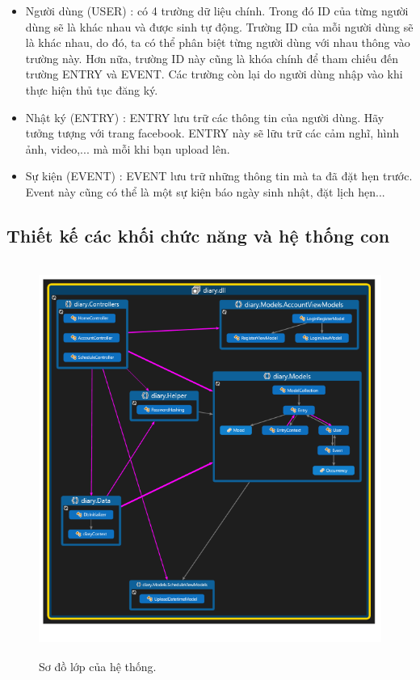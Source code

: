 \documentclass[a4paper]{article}
\begin{document}
\begin{itemize}
	\item Người dùng (USER) : có 4 trường dữ liệu chính. Trong đó ID của từng người dùng sẽ là khác nhau và được sinh tự động. Trường ID của mỗi người dùng sẽ là khác nhau, do đó, ta có thể phân biệt từng người dùng với nhau thông vào trường này. Hơn nữa, trường ID này cũng là khóa chính để tham chiếu đến trường ENTRY và EVENT. Các trường còn lại do người dùng nhập vào khi thực hiện thủ tục đăng ký.

	\item Nhật ký (ENTRY) : ENTRY lưu trữ các thông tin của người dùng. Hãy tưởng tượng với trang facebook. ENTRY này sẽ lữu trữ các cảm nghĩ, hình ảnh, video,... mà mỗi khi bạn upload lên.

	\item Sự  kiện (EVENT) : EVENT lưu trữ những thông tin mà ta đã đặt hẹn trước. Event này cũng có thể là một sự kiện báo ngày sinh nhật, đặt lịch hẹn...

\end{itemize}


\subsection{Thiết kế các khối chức năng và hệ thống con}

\begin{figure}[!h]
	  \centering
      \includegraphics[height=365pt,width=320pt]{Images/h2.png}
	  \caption{Sơ đồ lớp của hệ thống.}
	  \label{mainbook2}
	 \end{figure}
\end{document}
